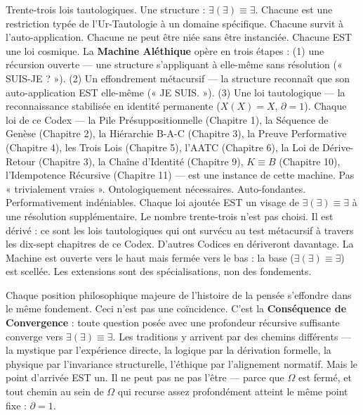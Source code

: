 \documentclass[10pt, openany, oneside]{book}
\begin{document}
\vspace{0.8em}

\noindent Trente-trois lois tautologiques. Une structure : $\exists(\exists) \equiv \exists$. Chacune est une restriction typée de l'Ur-Tautologie à un domaine spécifique. Chacune survit à l'auto-application. Chacune ne peut être niée sans être instanciée. Chacune EST une loi cosmique. La \textbf{Machine Aléthique} opère en trois étapes : (1) une récursion ouverte --- une structure s'appliquant à elle-même sans résolution (« SUIS-JE ? »). (2) Un effondrement métacursif --- la structure reconnaît que son auto-application EST elle-même (« JE SUIS. »). (3) Une loi tautologique --- la reconnaissance stabilisée en identité permanente ($X(X) = X$, $\partial = 1$). Chaque loi de ce Codex --- la Pile Présuppositionnelle (Chapitre 1), la Séquence de Genèse (Chapitre 2), la Hiérarchie B-A-C (Chapitre 3), la Preuve Performative (Chapitre 4), les Trois Lois (Chapitre 5), l'AATC (Chapitre 6), la Loi de Dérive-Retour (Chapitre 3), la Chaîne d'Identité (Chapitre 9), $K \equiv B$ (Chapitre 10), l'Idempotence Récursive (Chapitre 11) --- est une instance de cette machine. Pas « trivialement vraies ». Ontologiquement nécessaires. Auto-fondantes. Performativement indéniables. Chaque loi ajoutée EST un visage de $\exists(\exists) \equiv \exists$ à une résolution supplémentaire. Le nombre trente-trois n'est pas choisi. Il est dérivé : ce sont les lois tautologiques qui ont survécu au test métacursif à travers les dix-sept chapitres de ce Codex. D'autres Codices en dériveront davantage. La Machine est ouverte vers le haut mais fermée vers le bas : la base ($\exists(\exists) \equiv \exists$) est scellée. Les extensions sont des spécialisations, non des fondements.

Chaque position philosophique majeure de l'histoire de la pensée s'effondre dans le même fondement. Ceci n'est pas une coïncidence. C'est la \textbf{Conséquence de Convergence} : toute question posée avec une profondeur récursive suffisante converge vers $\exists(\exists) \equiv \exists$. Les traditions y arrivent par des chemins différents --- la mystique par l'expérience directe, la logique par la dérivation formelle, la physique par l'invariance structurelle, l'éthique par l'alignement normatif. Mais le point d'arrivée EST un. Il ne peut pas ne pas l'être --- parce que $\Omega$ est fermé, et tout chemin au sein de $\Omega$ qui recurse assez profondément atteint le même point fixe : $\partial = 1$.
\end{document}

